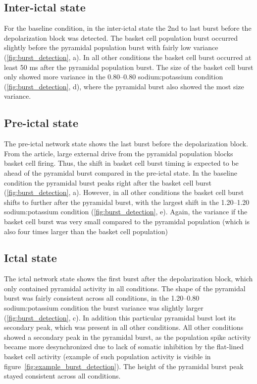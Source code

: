 \subsection{Inter-ictal state}
For the baseline condition, in the inter-ictal state the 2nd to last burst before the depolarization block was detected. 
The basket cell population burst occurred slightly before the pyramidal population burst with fairly low variance (\ref{fig:burst_detection}, a).
In all other conditions the basket cell burst occurred at least 50 ms after the pyramidal population burst. 
The size of the basket cell burst only showed more variance in the 0.80--0.80 sodium:potassium condition (\ref{fig:burst_detection}, d), where the pyramidal burst also showed the most size variance.

\subsection{Pre-ictal state}
The pre-ictal network state shows the last burst before the depolarization block.
From the \textcite{sanjayImpairedDendriticInhibition2015} article, large external drive from the pyramidal population blocks basket cell firing.
Thus, the shift in basket cell burst timing is expected to be ahead of the pyramidal burst compared in the pre-ictal state.
In the baseline condition the pyramidal burst peaks right after the basket cell burst (\ref{fig:burst_detection}, a).
However, in all other conditions the basket cell burst shifts to further after the pyramidal burst, with the largest shift in the 1.20--1.20 sodium:potassium condition (\ref{fig:burst_detection}, e).
Again, the variance if the basket cell burst was very small compared to the pyramidal population (which is also four times larger than the basket cell population)

\subsection{Ictal state}
The ictal network state shows the first burst after the depolarization block, which only contained pyramidal activity in all conditions.
The shape of the pyramidal burst was fairly consistent across all conditions, in the 1.20--0.80 sodium:potassium condition the burst variance was slightly larger (\ref{fig:burst_detection}, c).
In addition this particular pyramidal burst lost its secondary peak, which was present in all other conditions.
All other conditions showed a secondary peak in the pyramidal burst, as the population spike activity became more desynchronized due to lack of somatic inhibition by the flat-lined basket cell activity (example of such population activity is visible in figure~\ref{fig:example_burst_detection}).
The height of the pyramidal burst peak stayed consistent across all conditions.

